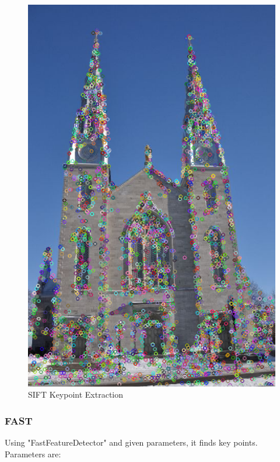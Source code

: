 \documentclass{article}
\begin{document}
\begin{figure}[H]
\begin{center}
\includegraphics[scale=0.3]{toolboxFeature.png}
\caption{SIFT Keypoint Extraction}
\end{center}
\end{figure}	   

	\subsubsection{FAST}
	Using "FastFeatureDetector" and given parameters, it finds key points. Parameters are:
\end{document}
